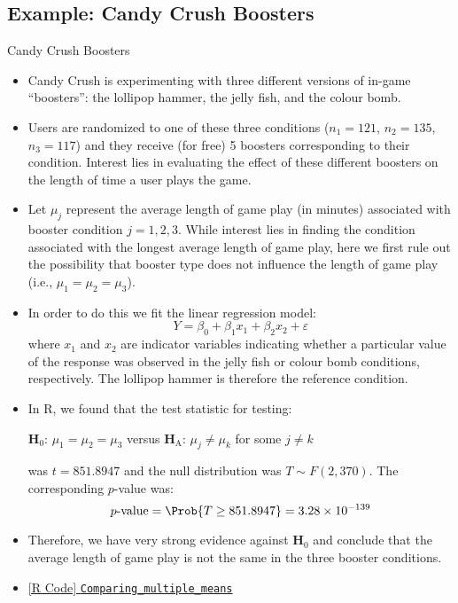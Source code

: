 \subsection{Example: Candy Crush Boosters}
\begin{Example}{Candy Crush Boosters}{}
      \begin{itemize}
            \item Candy Crush is experimenting with three different versions of
                  in-game ``boosters'': the lollipop hammer, the jelly fish, and the colour bomb.
            \item Users are randomized to one of these three conditions ($ n_1 = 121 $,
                  $ n_2 = 135 $, $ n_3 = 117$) and they
                  receive (for free) 5
                  boosters corresponding to their condition.
                  Interest lies in evaluating the effect
                  of these different boosters on the length of time a user plays the game.
            \item Let $ \mu_j $ represent the average length of game play
                  (in minutes) associated with booster condition
                  $ j = 1, 2, 3 $. While interest lies in finding the condition
                  associated with the longest average length
                  of game play, here we first rule out the possibility
                  that booster type does not influence the length
                  of game play (i.e., $ \mu_1=\mu_2=\mu_3 $).
            \item In order to do this we fit the linear regression model:
                  \[ Y=\beta_0+\beta_1 x_1+\beta_2 x_2+\varepsilon \]
                  where $ x_1 $ and $ x_2 $ are indicator variables indicating
                  whether a particular value of the response was observed in the
                  jelly fish or colour bomb conditions, respectively.
                  The lollipop hammer is therefore the reference condition.
            \item In R, we found that the test statistic for testing:
                  \begin{tightcenter}
                        $ \mathbf{H}_0 $: $ \mu_1=\mu_2=\mu_3 $ versus $ \mathbf{H}_\text{A} $: $ \mu_j\ne \mu_k $
                        for some $ j\ne k $
                  \end{tightcenter}
                  was $ t=851.8947 $ and the null distribution was $ T \sim F(2,370) $. The corresponding
                  $ p $-value was:
                  \[ p\text{-value}=\Prob{T\ge 851.8947}=3.28\times 10^{-139} \]
            \item Therefore, we have very strong evidence against $ \mathbf{H}_0 $ and conclude that the average
                  length of game play is not the same in the three booster conditions.
            \item \href{https://github.com/Hextical/university-notes/blob/master/year-3/semester-3/STAT 430/code/Comparing_multiple_means.R}{[R Code] \texttt{Comparing\_multiple\_means}}
      \end{itemize}
\end{Example}
